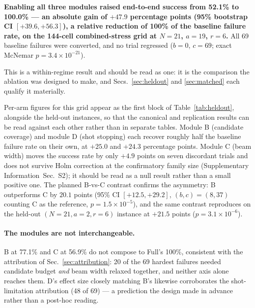 \documentclass[preprint,11pt]{elsarticle}
\newcommand{\SI}{Supplementary Information}
\newcommand{\SItables}{\SI{}~Sec.~S2}
\begin{document}
\textbf{Enabling all three modules raised end-to-end success from 52.1\%
to 100.0\% --- an absolute gain of $+47.9$ percentage points (95\%
bootstrap CI $[+39.6, +56.3]$), a relative reduction of 100\% of the
baseline failure rate, on the 144-cell combined-stress grid at $N=21$,
$a=19$, $r=6$.} All 69 baseline failures were converted, and no trial
regressed ($b=0$, $c=69$; exact McNemar $p=3.4\times10^{-21}$).

This is a within-regime result and should be read as one: it is the
comparison the ablation was designed to make, and Secs.~\ref{sec:heldout}
and \ref{sec:matched} each qualify it materially.

Per-arm figures for this grid appear as the first block of
Table~\ref{tab:heldout}, alongside the held-out instances, so that the
canonical and replication results can be read against each other rather
than in separate tables. Module B (candidate coverage) and module D (shot
stopping) each recover roughly half the baseline failure rate on their
own, at $+25.0$ and $+24.3$ percentage points. Module C (beam width)
moves the success rate by only $+4.9$ points on seven discordant trials
and does not survive Holm correction at the confirmatory family size
(\SItables{}); it should be read as a null result rather than a
small positive one. The planned B-vs-C contrast confirms the asymmetry:
B outperforms C by $20.1$ points (95\% CI $[+12.5,+29.2]$, $(b,c)=(8,37)$
counting C as the reference, $p=1.5\times10^{-5}$), and the same contrast
reproduces on the held-out $(N{=}21,a{=}2,r{=}6)$ instance at $+21.5$
points ($p=3.1\times10^{-6}$).



\paragraph{The modules are not interchangeable.} B at 77.1\% and C at
56.9\% do not compose to Full's 100\%, consistent with the attribution of
Sec.~\ref{sec:attribution}: 20 of the 69 hardest failures needed candidate
budget \emph{and} beam width relaxed together, and neither axis alone
reaches them. D's effect size closely matching B's likewise corroborates
the shot-limitation attribution (48 of 69) --- a prediction the design
made in advance rather than a post-hoc reading.
\end{document}

